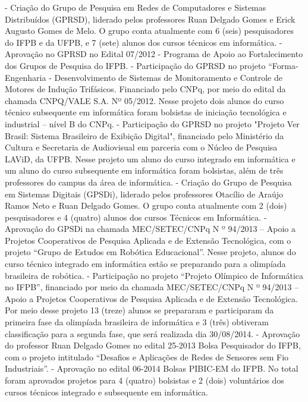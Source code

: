 -	Criação do Grupo de Pesquisa em Redes de Computadores e Sistemas Distribuídos (GPRSD), liderado pelos professores Ruan Delgado Gomes e Erick Augusto Gomes de Melo. O grupo  conta atualmente com 6 (seis) pesquisadores do IFPB e da UFPB, e 7 (sete) alunos dos cursos técnicos em informática.
-	Aprovação no GPRSD no Edital 07/2012 - Programa de Apoio ao Fortalecimento dos Grupos de Pesquisa do IFPB.
-	Participação do GPRSD no projeto “Forma-Engenharia - Desenvolvimento de Sistemas de Monitoramento e Controle de Motores de Indução Trifásicos. Financiado pelo CNPq, por meio do edital da chamada CNPQ/VALE S.A. Nº 05/2012. Nesse projeto dois alunos do curso técnico subsequente em informática foram bolsistas de iniciação tecnológica e industrial – nível B do CNPq.
-	Participação do GPRSD no projeto "Projeto Ver Brasil: Sistema Brasileiro de Exibição Digital", financiado pelo Ministério da Cultura e Secretaria de Audiovisual em parceria com o Núcleo de Pesquisa LAViD, da UFPB. Nesse projeto um aluno do curso integrado em informática e um aluno do curso subsequente em informática foram bolsistas, além de três professores do campus da área de informática.
-	Criação do Grupo de Pesquisa em Sistemas Digitais (GPSDi), liderado pelos professores Otacílio de Araújo Ramos Neto e Ruan Delgado Gomes. O grupo conta atualmente com 2 (dois) pesquisadores e 4 (quatro) alunos dos cursos Técnicos em Informática.
-	Aprovação do GPSDi na chamada MEC/SETEC/CNPq N º 94/2013 – Apoio a Projetos Cooperativos de Pesquisa Aplicada e de Extensão Tecnológica, com o projeto “Grupo de Estudos em Robótica Educacional”.  Nesse projeto, alunos do curso técnico integrado em informática estão se preparando para a olimpíada brasileira de robótica.
-	Participação no projeto “Projeto Olímpico de Informática no IFPB”, financiado por meio da chamada MEC/SETEC/CNPq N º 94/2013 – Apoio a Projetos Cooperativos de Pesquisa Aplicada e de Extensão Tecnológica. Por meio desse projeto 13 (treze) alunos se prepararam e participaram da primeira fase da olimpíada brasileira de informática e 3 (três) obtiveram classificação para a segunda fase, que será realizada dia 30/08/2014.
-	Aprovação do professor Ruan Delgado Gomes no edital 25-2013 Bolsa Pesquisador do IFPB, com o projeto intitulado “Desafios e Aplicações de Redes de Sensores sem Fio Industriais”.
-	Aprovação no edital 06-2014 Bolsas PIBIC-EM do IFPB. No total foram aprovados projetos para 4 (quatro) bolsistas e 2 (dois) voluntários dos cursos técnicos integrado e subsequente em informática.

